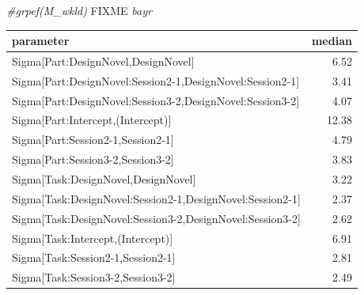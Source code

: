 \documentclass[]{svmono}
\newenvironment{Shaded}{\begin{snugshade}}{\end{snugshade}}
\newcommand{\KeywordTok}[1]{\textcolor[rgb]{0.13,0.29,0.53}{\textbf{#1}}}
\newcommand{\DataTypeTok}[1]{\textcolor[rgb]{0.13,0.29,0.53}{#1}}
\newcommand{\StringTok}[1]{\textcolor[rgb]{0.31,0.60,0.02}{#1}}
\newcommand{\CommentTok}[1]{\textcolor[rgb]{0.56,0.35,0.01}{\textit{#1}}}
\newcommand{\OperatorTok}[1]{\textcolor[rgb]{0.81,0.36,0.00}{\textbf{#1}}}
\newcommand{\AlertTok}[1]{\textcolor[rgb]{0.94,0.16,0.16}{#1}}
\newcommand{\NormalTok}[1]{#1}
\begin{document}
\begin{Shaded}
\begin{Highlighting}[]
\CommentTok{#grpef(M_wkld) }\AlertTok{FIXME}\CommentTok{ bayr}
\end{Highlighting}
\end{Shaded}

\begin{Shaded}
\end{Shaded}

\begin{tabular}{l|r}
\hline
parameter & median\\
\hline
Sigma[Part:DesignNovel,DesignNovel] & 6.52\\
\hline
Sigma[Part:DesignNovel:Session2-1,DesignNovel:Session2-1] & 3.41\\
\hline
Sigma[Part:DesignNovel:Session3-2,DesignNovel:Session3-2] & 4.07\\
\hline
Sigma[Part:Intercept,(Intercept)] & 12.38\\
\hline
Sigma[Part:Session2-1,Session2-1] & 4.79\\
\hline
Sigma[Part:Session3-2,Session3-2] & 3.83\\
\hline
Sigma[Task:DesignNovel,DesignNovel] & 3.22\\
\hline
Sigma[Task:DesignNovel:Session2-1,DesignNovel:Session2-1] & 2.37\\
\hline
Sigma[Task:DesignNovel:Session3-2,DesignNovel:Session3-2] & 2.62\\
\hline
Sigma[Task:Intercept,(Intercept)] & 6.91\\
\hline
Sigma[Task:Session2-1,Session2-1] & 2.81\\
\hline
Sigma[Task:Session3-2,Session3-2] & 2.49\\
\hline
\end{tabular}
\end{document}
